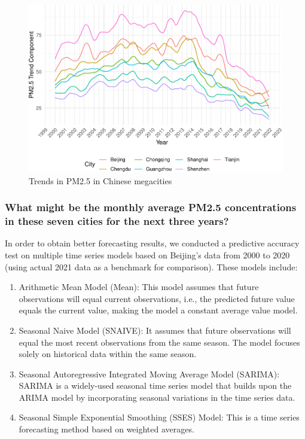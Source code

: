 \documentclass[
  12pt,
]{article}
\providecommand{\tightlist}{%
  \setlength{\itemsep}{0pt}\setlength{\parskip}{0pt}}
\begin{document}
\begin{figure}
\centering
\includegraphics{LiFangRenZhang_ENV872_Project_files/figure-latex/trend figure-1.pdf}
\caption{Trends in PM2.5 in Chinese megacities}
\end{figure}

\hypertarget{what-might-be-the-monthly-average-pm2.5-concentrations-in-these-seven-cities-for-the-next-three-years}{%
\subsubsection{What might be the monthly average PM2.5 concentrations in
these seven cities for the next three
years?}\label{what-might-be-the-monthly-average-pm2.5-concentrations-in-these-seven-cities-for-the-next-three-years}}

In order to obtain better forecasting results, we conducted a predictive
accuracy test on multiple time series models based on Beijing's data
from 2000 to 2020 (using actual 2021 data as a benchmark for
comparison). These models include:

\begin{enumerate}
\def\labelenumi{\arabic{enumi}.}
\tightlist
\item
  Arithmetic Mean Model (Mean): This model assumes that future
  observations will equal current observations, i.e., the predicted
  future value equals the current value, making the model a constant
  average value model.
\item
  Seasonal Naive Model (SNAIVE): It assumes that future observations
  will equal the most recent observations from the same season. The
  model focuses solely on historical data within the same season.
\item
  Seasonal Autoregressive Integrated Moving Average Model (SARIMA):
  SARIMA is a widely-used seasonal time series model that builds upon
  the ARIMA model by incorporating seasonal variations in the time
  series data.
\item
  Seasonal Simple Exponential Smoothing (SSES) Model: This is a time
  series forecasting method based on weighted averages.
\end{enumerate}
\end{document}

